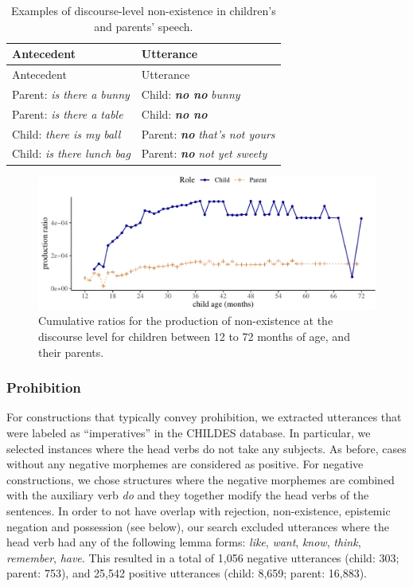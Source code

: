 \documentclass[
  man,floatsintext]{apa6}
\begin{document}
\begin{longtable}[]{@{}ll@{}}
\caption{\label{tab:disexist} Examples of discourse-level non-existence in children's and parents' speech.}\tabularnewline
\toprule\noalign{}
Antecedent & Utterance \\
\midrule\noalign{}
\endfirsthead
\toprule\noalign{}
Antecedent & Utterance \\
\midrule\noalign{}
\endhead
\bottomrule\noalign{}
\endlastfoot
Parent: \emph{is there a bunny} & Child: \textbf{\emph{no no}} \emph{bunny} \\
Parent: \emph{is there a table} & Child: \textbf{\emph{no no}} \\
Child: \emph{there is my ball} & Parent: \textbf{\emph{no}} \emph{that's not yours} \\
Child: \emph{is there lunch bag} & Parent: \textbf{\emph{no}} \emph{not yet sweety} \\
\end{longtable}

\begin{figure}[H]

{\centering \includegraphics{neg_construction_article_files/figure-latex/existencediscourse-1} 

}

\caption{Cumulative ratios for the production of non-existence at the discourse level for children between 12 to 72 months of age, and their parents.}\label{fig:existencediscourse}
\end{figure}

\hypertarget{prohibition}{%
\subsubsection{Prohibition}\label{prohibition}}

For constructions that typically convey prohibition, we extracted utterances that were labeled as ``imperatives'' in the CHILDES database. In particular, we selected instances where the head verbs do not take any subjects. As before, cases without any negative morphemes are considered as positive. For negative constructions, we chose structures where the negative morphemes are combined with the auxiliary verb \emph{do} and they together modify the head verbs of the sentences. In order to not have overlap with rejection, non-existence, epistemic negation and possession (see below), our search excluded utterances where the head verb had any of the following lemma forms: \emph{like}, \emph{want}, \emph{know}, \emph{think}, \emph{remember}, \emph{have}. This resulted in a total of 1,056 negative utterances (child: 303; parent: 753), and 25,542 positive utterances (child: 8,659; parent: 16,883).
\end{document}

